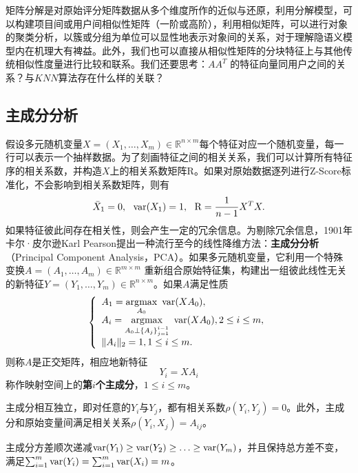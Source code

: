 \begin{remark}
矩阵分解是对原始评分矩阵数据从多个维度所作的近似与还原，利用分解模型，可以构建项目间或用户间相似性矩阵（一阶或高阶），利用相似矩阵，可以进行对象的聚类分析，以簇或分组为单位可以显性地表示对象间的关系，对于理解隐语义模型内在机理大有裨益。此外，我们也可以直接从相似性矩阵的分块特征上与其他传统相似性度量进行比较和联系。我们还要思考：$AA^T$ 的特征向量同用户之间的关系？与$KNN$算法存在什么样的关联？
\end{remark}
\subsection{主成分分析}
假设多元随机变量$X = (X_1,\ldots, X_m)\in \mathbb R^{n\times m}$每个特征对应一个随机变量，每一行可以表示一个抽样数据。为了刻画特征之间的相关关系，我们可以计算所有特征序的相关系数，并构造$X$上的相关系数矩阵R。如果对原始数据逐列进行Z-Score标准化，不会影响到相关系数矩阵，则有
\[
    \bar X_1 = 0, ~~\operatorname{\mathrm{var}}(X_1) = 1, ~~\text{R} = \frac{1}{n-1}X^T X.
\]
如果特征彼此间存在相关性，则会产生一定的冗余信息。为剔除冗余信息，1901年卡尔·皮尔逊Karl Pearson\cite{pearson1901liii}提出一种流行至今的线性降维方法：\textbf{主成分分析}（Principal Component Analysis，PCA）。如果多元随机变量，它利用一个特殊变换$A = (A_1, \ldots, A_m)\in \mathbb R^{m\times m}$ 重新组合原始特征集，构建出一组彼此线性无关的新特征$Y=(Y_1, \ldots, Y_m)\in \mathbb R^{n\times m}$。如果$A$满足性质
\begin{equation}
    \left\{
    \begin{array}{l}
        A_1 = \operatorname*{\mathrm{\arg\!\max}}\limits_{A_0}~ \operatorname{\mathrm{var}}(XA_0),\\
        A_i = \operatorname*{\mathrm{\arg\!\max}}\limits_{A_0\perp \{A_j\}_{j=1}^{i-1}}~ \operatorname{\mathrm{var}}(XA_0), 2 \le i \le m, \\
        \|A_i\|_2 = 1, 1\le i \le m.
    \end{array}
    \right.
\end{equation}
则称$A$是正交矩阵，相应地新特征
\begin{equation}
  Y_i = XA_i
\end{equation}
称作映射空间上的\textbf{第$i$个主成分}，$1\le i\le m$。

\begin{proposition}
主成分相互独立，即对任意的$Y_i$与$Y_j$，都有相关系数$\rho(Y_i, Y_j) = 0$。此外，主成分和原始变量间满足相关关系$\rho(Y_i, X_j) = A_{ij}$。
\end{proposition}

\begin{proposition}
主成分方差顺次递减$\operatorname{\mathrm{var}}(Y_1)\ge \operatorname{\mathrm{var}}(Y_2)\ge \ldots \ge\operatorname{\mathrm{var}}(Y_m)$，并且保持总方差不变，满足$\sum_{i=1}^m \operatorname{\mathrm{var}}(Y_i) = \sum_{i=1}^m \operatorname{\mathrm{var}}(X_i)=m$。
\end{proposition}


